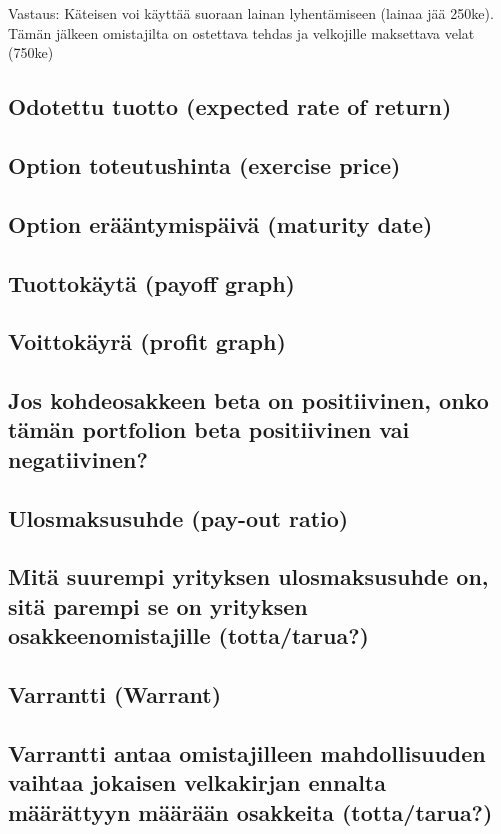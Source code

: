 \documentclass[a4paper]{article}
\begin{document}
Vastaus: Käteisen voi käyttää suoraan lainan lyhentämiseen (lainaa jää 250ke). Tämän jälkeen omistajilta on ostettava tehdas ja velkojille maksettava velat (750ke)

\subsection{Odotettu tuotto (expected rate of return)}

\subsection{Option toteutushinta (exercise price)}

\subsection{Option erääntymispäivä (maturity date)}

\subsection{Tuottokäytä (payoff graph)}

\subsection{Voittokäyrä (profit graph)}

\subsection{Jos kohdeosakkeen beta on positiivinen, onko tämän portfolion beta positiivinen vai negatiivinen?}

\subsection{Ulosmaksusuhde (pay-out ratio)}

\subsection{Mitä suurempi yrityksen ulosmaksusuhde on, sitä parempi se on yrityksen osakkeenomistajille (totta/tarua?)}

\subsection{Varrantti (Warrant)}

\subsection{Varrantti antaa omistajilleen mahdollisuuden vaihtaa jokaisen velkakirjan ennalta määrättyyn määrään osakkeita (totta/tarua?)}
\end{document}
